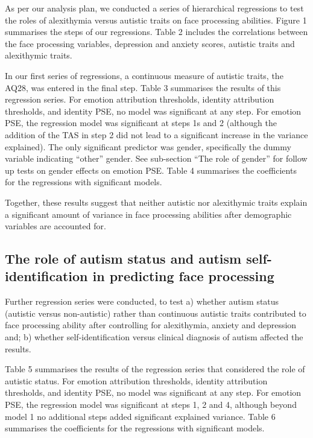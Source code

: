 \documentclass[
]{article}
\begin{document}
As per our analysis plan, we conducted a series of hierarchical regressions to test the roles of alexithymia versus autistic traits on face processing abilities. Figure 1 summarises the steps of our regressions. Table 2 includes the correlations between the face processing variables, depression and anxiety scores, autistic traits and alexithymic traits.

In our first series of regressions, a continuous measure of autistic traits, the AQ28, was entered in the final step. Table 3 summarises the results of this regression series. For emotion attribution thresholds, identity attribution thresholds, and identity PSE, no model was significant at any step. For emotion PSE, the regression model was significant at steps 1s and 2 (although the addition of the TAS in step 2 did not lead to a significant increase in the variance explained). The only significant predictor was gender, specifically the dummy variable indicating ``other'' gender. See sub-section ``The role of gender'' for follow up tests on gender effects on emotion PSE. Table 4 summarises the coefficients for the regressions with significant models.

Together, these results suggest that neither autistic nor alexithymic traits explain a significant amount of variance in face processing abilities after demographic variables are accounted for.

\hypertarget{the-role-of-autism-status-and-autism-self-identification-in-predicting-face-processing}{%
\subsection*{The role of autism status and autism self-identification in predicting face processing}\label{the-role-of-autism-status-and-autism-self-identification-in-predicting-face-processing}}

Further regression series were conducted, to test a) whether autism status (autistic versus non-autistic) rather than continuous autistic traits contributed to face processing ability after controlling for alexithymia, anxiety and depression and; b) whether self-identification versus clinical diagnosis of autism affected the results.

Table 5 summarises the results of the regression series that considered the role of autistic status. For emotion attribution thresholds, identity attribution thresholds, and identity PSE, no model was significant at any step. For emotion PSE, the regression model was significant at steps 1, 2 and 4, although beyond model 1 no additional steps added significant explained variance. Table 6 summarises the coefficients for the regressions with significant models.
\end{document}
